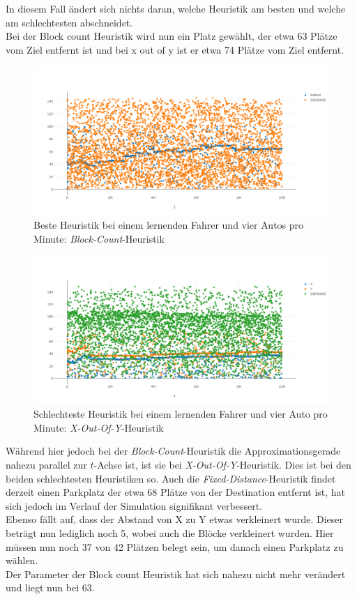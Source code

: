 In diesem Fall ändert sich nichts daran, welche Heuristik am besten und welche am schlechtesten abschneidet.\\
Bei der Block count Heuristik wird nun ein Platz gewählt, der etwa 63 Plätze vom Ziel entfernt ist und bei x out of y ist er etwa 74 Plätze vom Ziel entfernt. \\
\begin{figure}
	\includegraphics[width=\textwidth]{analyse/SingleMutant/blockcount4.png}
	\caption{Beste Heuristik bei einem lernenden Fahrer und vier Autos pro Minute: \emph{Block-Count}-Heuristik}\label{fig:res_sm_4pm_best}
\end{figure}
\begin{figure}
	\includegraphics[width=\textwidth]{analyse/SingleMutant/xy4.png}
	\caption{Schlechteste Heuristik bei einem lernenden Fahrer und vier Auto pro Minute: \emph{X-Out-Of-Y}-Heuristik}\label{fig:res_sm_4pm_worst}
\end{figure}
Während hier jedoch bei der \emph{Block-Count}-Heuristik die Approximationsgerade nahezu parallel zur $t$-Achse ist, ist sie bei \emph{X-Out-Of-Y}-Heuristik. Dies ist bei den beiden schlechtesten Heuristiken so. Auch die \emph{Fixed-Distance}-Heuristik findet derzeit einen Parkplatz der etwa 68 Plätze von der Destination entfernt ist, hat sich jedoch im Verlauf der Simulation signifikant verbessert.\\
Ebenso fällt auf, dass der Abstand von X zu Y etwas verkleinert wurde. Dieser beträgt nun lediglich noch 5, wobei auch die Blöcke verkleinert wurden. Hier müssen nun noch 37 von 42 Plätzen belegt sein, um danach einen Parkplatz zu wählen.\\
Der Parameter der Block count Heuristik hat sich nahezu nicht mehr verändert und liegt nun bei 63.\\

